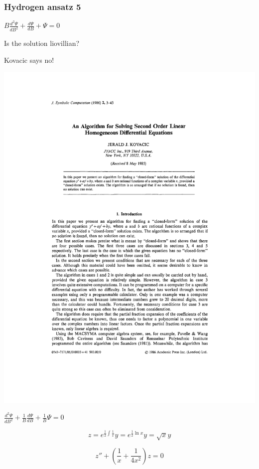 \documentclass{beamer}
\begin{document}
\begin{frame}[fragile]
\frametitle{Hydrogen ansatz 5}
\small

\centerline{$B \frac{d^2\Psi}{dB^2} + \frac{d\Psi}{dB} + \Psi = 0$}
\vskip 10pt
\centerline{Is the solution liovillian?}
\centerline{Kovacic says no!}

\includegraphics[page=3,clip,trim=0in 7.2in 0in 1.2in, width=\textwidth]{Kovacic.pdf}

\centerline{$\frac{d^2\Psi}{dB^2} + \frac{1}{B}\frac{d\Psi}{dB} + \frac{1}{B}\Psi = 0$}

$$z=e^{\frac{1}{2}\int\frac{1}{x}} y = e^{\frac{1}{2}\ln x} y = \sqrt{x}y$$

$$z'' + \left(\frac{1}{x} + \frac{1}{4x^2}\right) z = 0$$

\end{frame}
\end{document}

